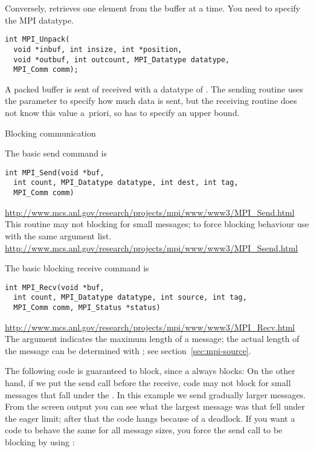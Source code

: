 Conversely,  retrieves one element
from the buffer at a time. You need to specify the MPI datatype.
\begin{verbatim}
int MPI_Unpack(
  void *inbuf, int insize, int *position,
  void *outbuf, int outcount, MPI_Datatype datatype,
  MPI_Comm comm);
\end{verbatim}

A packed buffer is sent of received with a datatype of
. The sending routine uses the 
parameter to specify how much data is sent, but the receiving routine
does not know this value a~priori, so has to specify an upper bound.


 {Blocking communication}

The basic send command is
\begin{verbatim}
int MPI_Send(void *buf, 
  int count, MPI_Datatype datatype, int dest, int tag,
  MPI_Comm comm)
\end{verbatim}
\url{http://www.mcs.anl.gov/research/projects/mpi/www/www3/MPI_Send.html}
This routine may not blocking for small messages; to force blocking
behaviour use  with the same argument list.
\url{http://www.mcs.anl.gov/research/projects/mpi/www/www3/MPI_Ssend.html}

The basic blocking receive command is
\begin{verbatim}
int MPI_Recv(void *buf, 
  int count, MPI_Datatype datatype, int source, int tag,
  MPI_Comm comm, MPI_Status *status)
\end{verbatim}
\url{http://www.mcs.anl.gov/research/projects/mpi/www/www3/MPI_Recv.html}
The  argument indicates the maximum length of a message; the
actual length of the message can be determined with ; 
see section~\ref{sec:mpi-source}.

The following code is guaranteed to block, since a 
always blocks:
On the other hand, if we put the send call before the receive,
code may not block for small messages
that fall under the . In this example we send
gradually larger messages. From the screen output you can see what
the largest message was that fell under the eager limit; after that the code
hangs because of a deadlock.
If you want a code to behave the same for all message sizes,
you force the send call to be blocking by using :

